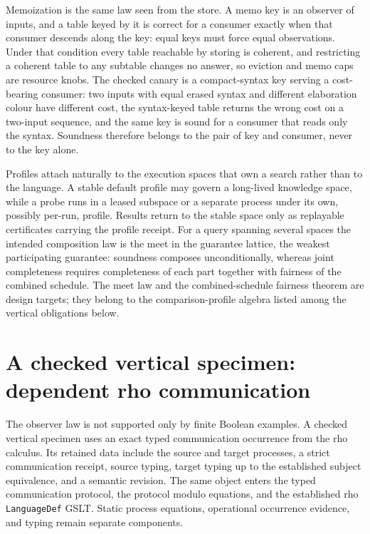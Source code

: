 \documentclass[11pt]{article}
\theoremstyle{definition}
\theoremstyle{remark}
\newcommand{\code}[1]{\texttt{#1}}
\begin{document}
Memoization is the same law seen from the store.  A memo key is an observer
of inputs, and a table keyed by it is correct for a consumer exactly when that
consumer descends along the key: equal keys must force equal observations.
Under that condition every table reachable by storing is coherent, and
restricting a coherent table to any subtable changes no answer, so eviction
and memo caps are resource knobs.  The checked canary is a compact-syntax key
serving a cost-bearing consumer: two inputs with equal erased syntax and
different elaboration colour have different cost, the syntax-keyed table
returns the wrong cost on a two-input sequence, and the same key is sound for
a consumer that reads only the syntax.  Soundness therefore belongs to the
pair of key and consumer, never to the key alone.

Profiles attach naturally to the execution spaces that own a search rather
than to the language.  A stable default profile may govern a long-lived
knowledge space, while a probe runs in a leased subspace or a separate process
under its own, possibly per-run, profile.  Results return to the stable space
only as replayable certificates carrying the profile receipt.  For a query
spanning several spaces the intended composition law is the meet in the
guarantee lattice, the weakest participating guarantee: soundness composes
unconditionally, whereas joint completeness requires completeness of each
part together with fairness of the combined schedule.  The meet law and the
combined-schedule fairness theorem are design targets; they belong to the
comparison-profile algebra listed among the vertical obligations below.

\section{A checked vertical specimen: dependent rho communication}

The observer law is not supported only by finite Boolean examples.  A checked
vertical specimen uses an exact typed communication occurrence from the rho
calculus.  Its retained data include the source and target processes, a strict
communication receipt, source typing, target typing up to the established
subject equivalence, and a semantic revision.  The same object enters the typed
communication protocol, the protocol modulo equations, and the established
rho \code{LanguageDef} GSLT.  Static process equations, operational occurrence
evidence, and typing remain separate components.
\end{document}
